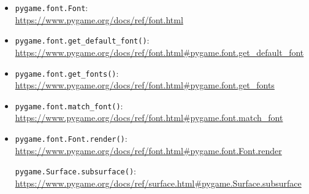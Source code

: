 \begin{itemize}
	\item \texttt{pygame.font.Font}:
	\\ \url{https://www.pygame.org/docs/ref/font.html}
	
	\item \texttt{pygame.font.get\_default\_font()}:
	\\ \url{https://www.pygame.org/docs/ref/font.html#pygame.font.get_default_font}

	\item \texttt{pygame.font.get\_fonts()}:
	\\ \url{https://www.pygame.org/docs/ref/font.html#pygame.font.get_fonts}
	
    \item \texttt{pygame.font.match\_font()}:
    \\
    \url{https://www.pygame.org/docs/ref/font.html#pygame.font.match_font}

	\item \texttt{pygame.font.Font.render()}:
    \\ \url{https://www.pygame.org/docs/ref/font.html#pygame.font.Font.render}

	\texttt{pygame.Surface.subsurface()}:
    \\ \url{https://www.pygame.org/docs/ref/surface.html#pygame.Surface.subsurface}


\end{itemize}


